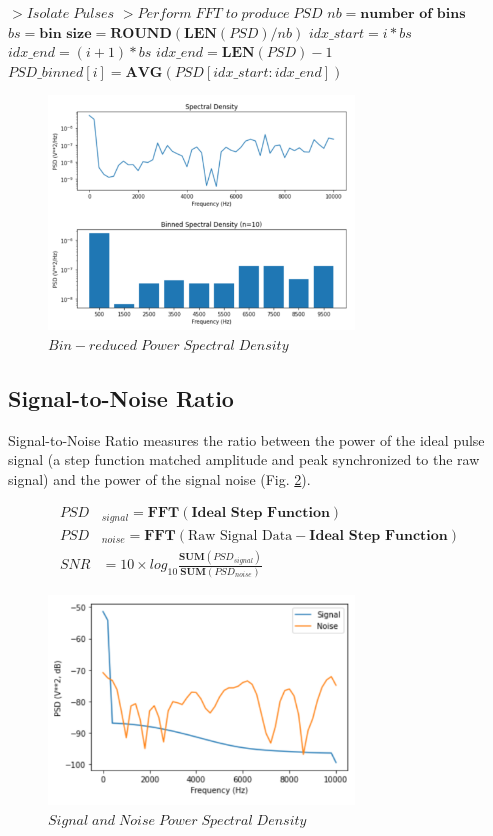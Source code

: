 \documentclass[conference]{IEEEtran}
\begin{document}
\medbreak
\begin{algorithmic}
\STATE $> Isolate\;Pulses$
\STATE $>Perform\;FFT\;to\;produce\;PSD$
\STATE $nb = \textbf{number of bins}$
\STATE $bs = \textbf{bin size} = \textbf{ROUND}(\textbf{LEN}(PSD)/nb)$
    \STATE $idx\_start = i * bs$
    \STATE $idx\_end = (i+1) * bs$
        \STATE $idx\_end = \textbf{LEN}(PSD) - 1$
    \ENDIF
    \STATE $PSD\_binned[i] = \textbf{AVG}( PSD[ idx\_start : idx\_end ] )$
\ENDFOR
\end{algorithmic}

\begin{figure}[htb]
\centering
\includegraphics[width=3.2in]{figures/55_psd_bin.png}
\caption{$Bin-reduced\;Power\;Spectral\;Density$}
\label{fig:PSDBin}
\end{figure}

\subsection{Signal-to-Noise Ratio} \label{sec:SNR}
Signal-to-Noise Ratio measures the ratio between the power of the ideal pulse signal (a step function matched amplitude and peak synchronized to the raw signal) and the power of the signal noise (Fig. \ref{fig:SNR}).

\begin{align*}
    PSD&_{signal} = \textbf{FFT}(\textbf{Ideal Step Function})\\
    PSD&_{noise} = \textbf{FFT}(\text{Raw Signal Data} - \textbf{Ideal Step Function})\\
    SNR &= 10 \times log_{10} \frac{ \textbf{SUM}(PSD_{signal}) }{ \textbf{SUM}(PSD_{noise}) }
\end{align*}

\begin{figure}[htb]
\centering
\includegraphics[width=3.2in]{figures/56_snr.png}
\caption{$Signal\;and\;Noise\;Power\;Spectral\;Density$}
\label{fig:SNR}
\end{figure}
\end{document}

